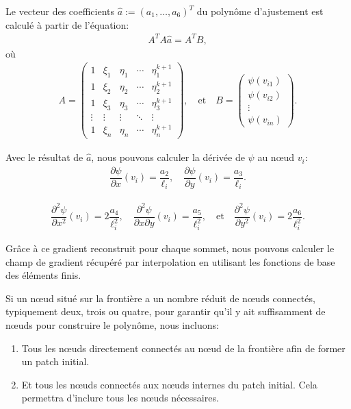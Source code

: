 \documentclass[12pt]{book}
\theoremstyle{bfnote}
\theoremstyle{bfnote}
\begin{document}
Le vecteur des coefficients $\hat{a}:= (a_1, \ldots, a_6)^T$ du polynôme d'ajustement est calculé à partir de l'équation:
\begin{align}
    A^T A \hat{a} = A^T B,
\end{align}
où
\begin{align*}
    A = \begin{pmatrix}
        1 & \xi_1 & \eta_1 & \cdots & \eta_1^{k+1} \\
        1 & \xi_2 & \eta_2 & \cdots & \eta_2^{k+1} \\
        1 & \xi_3 & \eta_3 & \cdots & \eta_3^{k+1} \\
        \vdots & \vdots & \vdots & \ddots & \vdots \\
        1 & \xi_n & \eta_n & \cdots & \eta_n^{k+1}
    \end{pmatrix},
    \quad \text{et} \quad
    B = \begin{pmatrix}
        \psi(v_{i1}) \\
        \psi(v_{i2}) \\
        \vdots \\
        \psi(v_{in})
    \end{pmatrix}.
\end{align*}

Avec le résultat de $\hat{a}$, nous pouvons calculer la dérivée de $\psi$ au nœud $v_i$:
\begin{align*}
    \dfrac{\partial \psi}{\partial x} (v_i) = \dfrac{a_2}{\ell_i}, \quad \dfrac{\partial \psi}{\partial y} (v_i) = \dfrac{a_3}{\ell_i}.
\end{align*}

\begin{align*}
    \dfrac{\partial^2 \psi}{\partial x^2} (v_i) = 2\dfrac{a_4}{\ell_i^2}, \quad \dfrac{\partial^2 \psi}{\partial x \partial y} (v_i) = \dfrac{a_5}{\ell_i^2}, \quad \text{et} \quad \dfrac{\partial^2 \psi}{\partial y^2} (v_i) = 2\dfrac{a_6}{\ell_i^2}.
\end{align*}

Grâce à ce gradient reconstruit pour chaque sommet, nous pouvons calculer le champ de gradient récupéré par interpolation en utilisant les fonctions de base des éléments finis.

Si un nœud situé sur la frontière a un nombre réduit de nœuds connectés, typiquement deux, trois ou quatre, pour garantir qu'il y ait suffisamment de nœuds pour construire le polynôme, nous incluons:

\begin{enumerate}
    \item Tous les nœuds directement connectés au nœud de la frontière afin de former un patch initial.
    \item Et tous les nœuds connectés aux nœuds internes du patch initial. Cela permettra d'inclure tous les nœuds nécessaires.
\end{enumerate}
\end{document}
